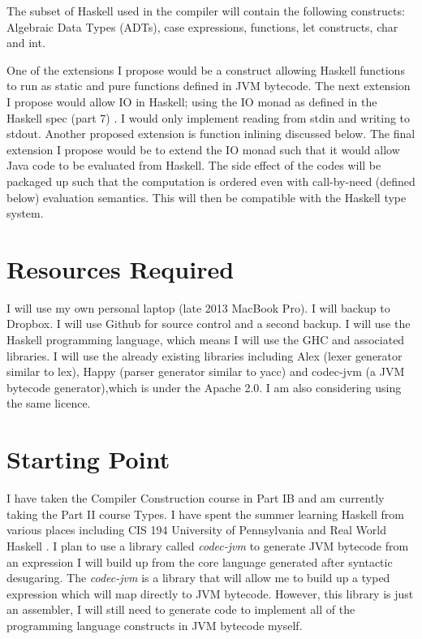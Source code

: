 \documentclass[12pt,a4paper,twoside]{article}
\begin{document}
  The subset of Haskell used in the compiler will contain the following constructs: Algebraic Data Types (ADTs), case expressions,
  functions, let constructs, char and int.

  One of the extensions I propose would be a construct allowing Haskell functions to run as static and pure functions defined in JVM bytecode.
  The next extension I propose would allow IO in Haskell; using the IO monad as defined in the Haskell spec (part 7) \cite{haskell98-spec}.
  I would only implement reading from stdin and writing to stdout. Another proposed extension is function inlining discussed below.
  The final extension I propose would be to extend the IO monad such that it would allow Java code to be evaluated from Haskell. The side effect of the codes
  will be packaged  up such that the computation is ordered even with call-by-need (defined below) evaluation semantics.
  This will then be compatible with the Haskell type system.

\section*{Resources Required}
  I will use my own personal laptop (late 2013 MacBook Pro).
  I will backup to Dropbox.
  I will use Github for source control and a second backup.
  I will use the Haskell programming language, which means I will use the GHC and associated libraries.
  I will use the already existing libraries including Alex (lexer generator similar to lex),
  Happy (parser generator similar to yacc) and codec-jvm (a JVM bytecode generator),which is under the Apache 2.0. I am also considering using the same licence.

\section*{Starting Point}
  I have taken the Compiler Construction course in Part IB and am currently taking the Part II course Types. I have spent the summer
  learning Haskell from various places including CIS 194 University of Pennsylvania \cite{cis194} and Real World Haskell \cite{realworldhaskell}.
  I plan to use a library called \textit{codec-jvm} to generate JVM bytecode from an expression I will build up from the core language generated after
  syntactic desugaring. The \textit{codec-jvm} is a library that will allow me to build up a typed expression which will map directly
  to JVM bytecode. However, this library is just an assembler, I will still need to generate code to implement all of the
  programming language constructs in JVM bytecode myself.
\end{document}
